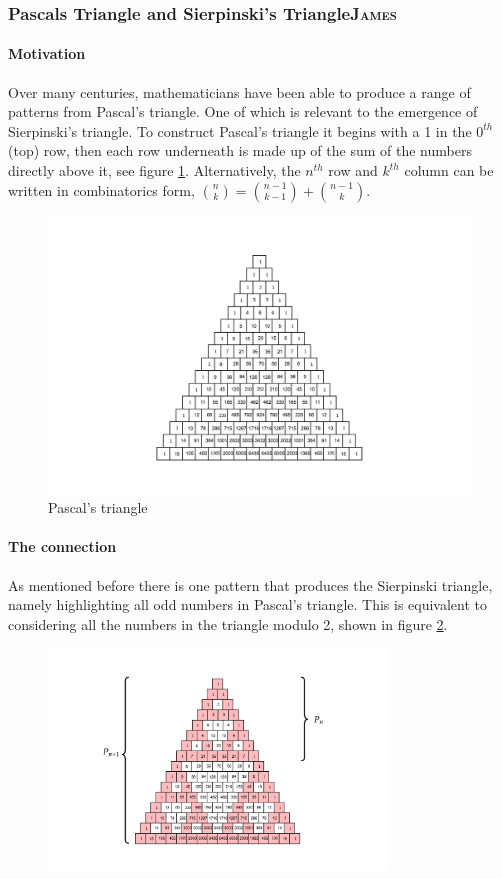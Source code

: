 \documentclass[a4paper,11pt,twoside]{article}
\begin{document}
\subsubsection{Pascals Triangle and Sierpinski's Triangle\hfill{}\textsc{James}}
\label{pascal-sierpinski}
\paragraph{Motivation}
\label{sec:org0a90ce4}
Over many centuries, mathematicians have been able to produce a range of patterns from Pascal's triangle. One of which is relevant to the emergence of Sierpinski's triangle. To construct Pascal's triangle it begins with a 1 in the \(0^{th}\) (top) row, then each row underneath is made up of the sum of the numbers directly above it, see figure \ref{fig:pascal-triangle}. Alternatively, the \(n^{th}\) row and \(k^{th}\) column can be written in combinatorics form, \(\binom{n}{k} = \binom{n-1}{k-1} + \binom{n-1}{k}\).

\begin{figure}[htbp]
\centering
\includegraphics[width=.9\linewidth]{media/tikz/pascals-triangle.png}
\caption{\label{fig:pascal-triangle}Pascal's triangle}
\end{figure}
\paragraph{The connection}
\label{sec:org5ecf915}
As mentioned before there is one pattern that produces the Sierpinski triangle, namely highlighting all odd numbers in Pascal's triangle. This is equivalent to considering all the numbers in the triangle modulo 2, shown in figure \ref{fig:pascal-sierpinski-tri}.

\begin{figure}[htbp]
\centering
\includegraphics[width=9cm]{media/tikz/pascal-sierpinski-tri.png}
\label{fig:pascal-sierpinski-tri}
\end{figure}
\end{document}
